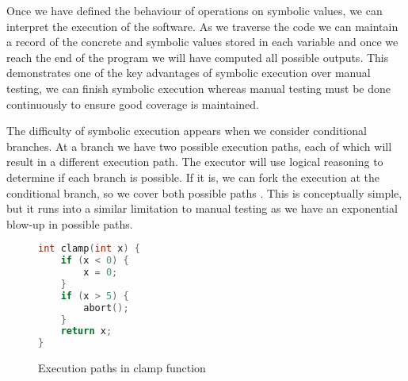 \documentclass[12pt,twoside]{report}
\begin{document}
Once we have defined the behaviour of operations on symbolic values, we can interpret the execution of the software. As we traverse the code we can maintain a record of the concrete and symbolic values stored in each variable and once we reach the end of the program we will have computed all possible outputs. This demonstrates one of the key advantages of symbolic execution over manual testing, we can finish symbolic execution whereas manual testing must be done continuously to ensure good coverage is maintained. 

The difficulty of symbolic execution appears when we consider conditional branches. At a branch we have two possible execution paths, each of which will result in a different execution path. The executor will use logical reasoning to determine if each branch is possible. If it is, we can fork the execution at the conditional branch, so we cover both possible paths \cite{10.1145/360248.360252, cadar2008klee}. This is conceptually simple, but it runs into a similar limitation to manual testing as we have an exponential blow-up in possible paths.


\begin{figure}
    \centering
    \begin{minipage}{0.3\textwidth}
    \begin{lstlisting}[language=C]
int clamp(int x) {
    if (x < 0) {
        x = 0;
    }
    if (x > 5) {
        abort();
    }
    return x;
}
\end{lstlisting}
    \end{minipage}
    \begin{minipage}{0.6\textwidth}
    \end{minipage}
    \caption{Execution paths in clamp function}
    \label{fig:foopaths}
\end{figure}
\end{document}
